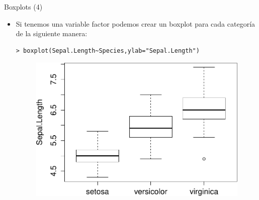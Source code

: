 \documentclass[handout]{beamer}
\begin{document}
\begin{frame}[fragile]{Boxplots (4)}
\scriptsize{
\begin{itemize}

\item Si tenemos una variable factor podemos crear un boxplot para cada categoría de la siguiente manera:
\begin{verbatim}
> boxplot(Sepal.Length~Species,ylab="Sepal.Length")
\end{verbatim}

 \begin{figure}[h!]
	\centering
	\includegraphics[scale=0.5]{pics/boxplotfactor.pdf}		
\end{figure} 
 
\end{itemize}

}
\end{frame}
\end{document}
